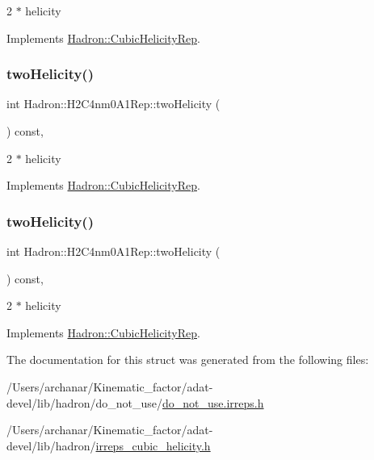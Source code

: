 2 $\ast$ helicity 

Implements \mbox{\hyperlink{structHadron_1_1CubicHelicityRep_af507aa56fc2747eacc8cb6c96db31ecc}{Hadron\+::\+Cubic\+Helicity\+Rep}}.

\mbox{\label{structHadron_1_1H2C4nm0A1Rep_aa238eba0bfb059bc24baca59a75c48af}} 
\subsubsection{\texorpdfstring{twoHelicity()}{twoHelicity()}\hspace{0.1cm}{\footnotesize\ttfamily [2/3]}}
{\footnotesize\ttfamily int Hadron\+::\+H2\+C4nm0\+A1\+Rep\+::two\+Helicity (\begin{DoxyParamCaption}{ }\end{DoxyParamCaption}) const\hspace{0.3cm}{\ttfamily [inline]}, {\ttfamily [virtual]}}

2 $\ast$ helicity 

Implements \mbox{\hyperlink{structHadron_1_1CubicHelicityRep_af507aa56fc2747eacc8cb6c96db31ecc}{Hadron\+::\+Cubic\+Helicity\+Rep}}.

\mbox{\label{structHadron_1_1H2C4nm0A1Rep_aa238eba0bfb059bc24baca59a75c48af}} 
\subsubsection{\texorpdfstring{twoHelicity()}{twoHelicity()}\hspace{0.1cm}{\footnotesize\ttfamily [3/3]}}
{\footnotesize\ttfamily int Hadron\+::\+H2\+C4nm0\+A1\+Rep\+::two\+Helicity (\begin{DoxyParamCaption}{ }\end{DoxyParamCaption}) const\hspace{0.3cm}{\ttfamily [inline]}, {\ttfamily [virtual]}}

2 $\ast$ helicity 

Implements \mbox{\hyperlink{structHadron_1_1CubicHelicityRep_af507aa56fc2747eacc8cb6c96db31ecc}{Hadron\+::\+Cubic\+Helicity\+Rep}}.



The documentation for this struct was generated from the following files\+:\begin{DoxyCompactItemize}
\item 
/\+Users/archanar/\+Kinematic\+\_\+factor/adat-\/devel/lib/hadron/do\+\_\+not\+\_\+use/\mbox{\hyperlink{adat-devel_2lib_2hadron_2do__not__use_2do__not__use_8irreps_8h}{do\+\_\+not\+\_\+use.\+irreps.\+h}}\item 
/\+Users/archanar/\+Kinematic\+\_\+factor/adat-\/devel/lib/hadron/\mbox{\hyperlink{adat-devel_2lib_2hadron_2irreps__cubic__helicity_8h}{irreps\+\_\+cubic\+\_\+helicity.\+h}}\end{DoxyCompactItemize}
